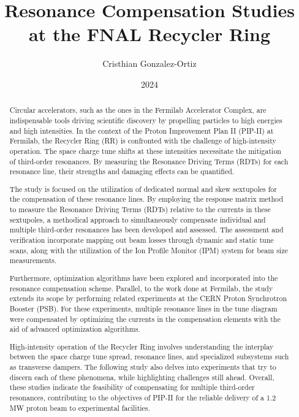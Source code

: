 \documentclass[]{msu-thesis}
\title{Resonance Compensation Studies at the FNAL Recycler Ring}
\author{Cristhian Gonzalez-Ortiz}
\date{2024}
\begin{document}
\frontmatter
\maketitlepage


\begin{abstract}
Circular accelerators, such as the ones in the Fermilab Accelerator Complex, are indispensable tools driving scientific discovery by propelling particles to high energies and high intensities. In the context of the Proton Improvement Plan II (PIP-II) at Fermilab, the Recycler Ring (RR) is confronted with the challenge of high-intensity operation. The space charge tune shifts at these intensities necessitate the mitigation of third-order resonances. By measuring the Resonance Driving Terms (RDTs) for each resonance line, their strengths and damaging effects can be quantified. 

The study is focused on the utilization of dedicated normal and skew sextupoles for the compensation of these resonance lines. By employing the response matrix method to measure the Resonance Driving Terms (RDTs) relative to the currents in these sextupoles, a methodical approach to simultaneously compensate individual and multiple third-order resonances has been developed and assessed. The assessment and verification incorporate mapping out beam losses through dynamic and static tune scans, along with the utilization of the Ion Profile Monitor (IPM) system for beam size measurements. 

Furthermore, optimization algorithms have been explored and incorporated into the resonance compensation scheme. Parallel, to the work done at Fermilab, the study extends its scope by performing related experiments at the CERN Proton Synchrotron Booster (PSB). For these experiments, multiple resonance lines in the tune diagram were compensated by optimizing the currents in the compensation elements with the aid of advanced optimization algorithms.  

High-intensity operation of the Recycler Ring involves understanding the interplay between the space charge tune spread, resonance lines, and specialized subsystems such as transverse dampers. The following study also delves into experiments that try to discern each of these phenomena, while highlighting challenges still ahead. Overall, these studies indicate the feasibility of compensating for multiple third-order resonances, contributing to the objectives of PIP-II for the reliable delivery of a 1.2 MW proton beam to experimental facilities.
\end{abstract}
\end{document}
